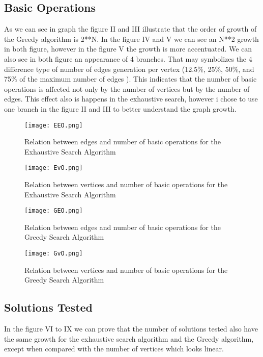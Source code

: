 \documentclass[...]{revdetua}
\begin{document}
\subsection{Basic Operations}
As we can see in graph the figure II and III illustrate that the order of growth of the Greedy algorithm is 2**N. In the figure IV and V we can see an N**2 growth in both figure, however in the figure V the growth is more accentuated. We can also see in both figure an appearance of 4 branches. That may symbolizes the 4 difference type of number of edges generation per vertex (12.5\%, 25\%, 50\%, and 75\% of the maximum number of edges ). This indicates that the number of basic operations is affected not only by the number of vertices but by the number of edges. This effect also is happens in the exhaustive search, however i chose to use one branch in the figure II and III to better understand the graph growth. 


\begin{figure}[H]
\centering
\texttt{[image: EEO.png]}
\label{fig:EEO}
\caption{Relation between edges and number of basic operations for the Exhaustive Search Algorithm}
\end{figure}

\begin{figure}[H]
\centering
\texttt{[image: EvO.png]}
\label{fig:EvO}
\caption{Relation between vertices and number of basic operations for the Exhaustive Search Algorithm}
\end{figure}

\begin{figure}[H]
\centering
\texttt{[image: GEO.png]}
\label{fig:GEO}
\caption{Relation between edges and number of basic operations for the Greedy Search Algorithm}
\end{figure}

\begin{figure}[H]
\centering
\texttt{[image: GvO.png]}
\label{fig:GvO}
\caption{Relation between vertices and number of basic operations for the Greedy Search Algorithm}
\end{figure}

\subsection{Solutions Tested}


In the  figure VI to IX we can prove that the number of solutions tested also have the same growth for the exhaustive search algorithm and the Greedy algorithm, except when compared with the number of vertices which looks linear. 
\end{document}
